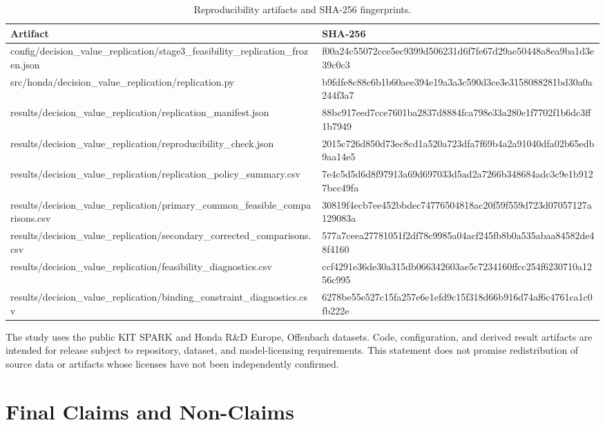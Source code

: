 \documentclass[10pt,twocolumn]{article}
\begin{document}
\begin{table}[t]
\centering
\caption{Reproducibility artifacts and SHA-256 fingerprints.}
\label{tab:artifact-hashes}
\scriptsize
\begin{tabularx}{\textwidth}{>{\ttfamily}X >{\ttfamily}p{}}
\toprule
\normalfont Artifact & \normalfont SHA-256\\
\midrule
config/decision\_value\_replication/stage3\_feasibility\_replication\_frozen.json & f00a24c55072cce5ec9399d506231d6f7fe67d29ae50448a8ea9ba1d3e39c0c3\\
src/honda/decision\_value\_replication/replication.py & b9fdfe8c88c6b1b60aee394e19a3a3c590d3ce3e3158088281bd30a0a244f3a7\\
results/decision\_value\_replication/replication\_manifest.json & 88bc917eed7cce7601ba2837d8884fca798e33a280e1f7702f1b6dc3ff1b7949\\
results/decision\_value\_replication/reproducibility\_check.json & 2015c726d850d73ec8cd1a520a723dfa7f69b4a2a91040dfa02b65edb9aa14e5\\
results/decision\_value\_replication/replication\_policy\_summary.csv & 7e4c5d5d6d8f97913a69d697033d5ad2a7266b348684adc3c9e1b9127bcc49fa\\
results/decision\_value\_replication/primary\_common\_feasible\_comparisons.csv & 30819f4ecb7ee452bbdec74776504818ac20f59f559d723d07057127a129083a\\
results/decision\_value\_replication/secondary\_corrected\_comparisons.csv & 577a7ceea27781051f2df78c9985a04acf245fb8b0a535abaa84582de48f4160\\
results/decision\_value\_replication/feasibility\_diagnostics.csv & ccf4291e36de30a315db066342603ae5c7234160ffcc254f6230710a1256c995\\
results/decision\_value\_replication/binding\_constraint\_diagnostics.csv & 6278be55e527c15fa257e6e1efd9c15f318d66b916d74af6c4761ca1c0fb222e\\
\bottomrule
\end{tabularx}
\end{table}

The study uses the public KIT SPARK and Honda R\&D Europe, Offenbach datasets.
Code, configuration, and derived result artifacts are intended for release
subject to repository, dataset, and model-licensing requirements. This statement
does not promise redistribution of source data or artifacts whose licenses have
not been independently confirmed.

\section{Final Claims and Non-Claims}
\label{sec:claims}
\end{document}
